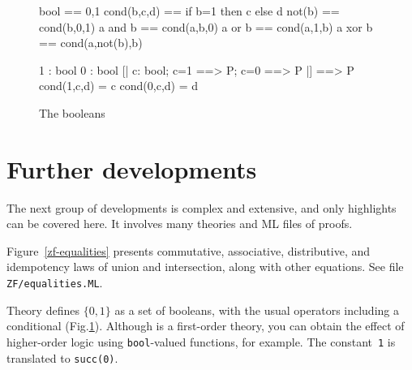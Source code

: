 \begin{figure}
%
\begin{ttbox}
       bool == {\ttlbrace}0,1{\ttrbrace}
       cond(b,c,d) == if b=1 then c else d
        not(b)  == cond(b,0,1)
        a and b == cond(a,b,0)
         a or b  == cond(a,1,b)
        a xor b == cond(a,not(b),b)

        1 : bool
        0 : bool
          [| c: bool;  c=1 ==> P;  c=0 ==> P |] ==> P
         cond(1,c,d) = c
         cond(0,c,d) = d
\end{ttbox}
\caption{The booleans} \label{zf-bool}
\end{figure}


\section{Further developments}
The next group of developments is complex and extensive, and only
highlights can be covered here.  It involves many theories and ML files of
proofs. 

Figure~\ref{zf-equalities} presents commutative, associative, distributive,
and idempotency laws of union and intersection, along with other equations.
See file \texttt{ZF/equalities.ML}.

Theory  defines $\{0,1\}$ as a set of booleans, with the usual
operators including a conditional (Fig.\ts\ref{zf-bool}).  Although {\ZF} is a
first-order theory, you can obtain the effect of higher-order logic using
\texttt{bool}-valued functions, for example.  The constant~\texttt{1} is
translated to \texttt{succ(0)}.

